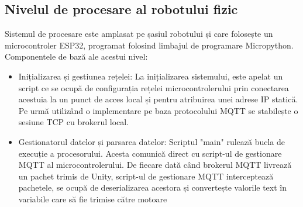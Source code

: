 \subsection{Nivelul de procesare al robotului fizic}
Sistemul de procesare este amplasat pe șasiul robotului și care folosește un microcontroler ESP32, programat folosind limbajul de programare Micropython. Componentele de bază ale acestui nivel:
\begin{itemize}
	\item Inițializarea și gestiunea rețelei: La inițializarea sistemului, este apelat un script ce se ocupă de configurația rețelei microcontrolerului prin conectarea acestuia la un punct de acces local și pentru  atribuirea unei adrese IP statică. Pe urmă utilizând o implementare pe baza protocolului MQTT se stabilește o sesiune TCP cu brokerul local.
	\item Gestionatorul datelor și parsarea datelor: Scriptul "main" rulează bucla de execuție a procesorului. Acesta comunică direct cu script-ul de gestionare MQTT al microcontrolerului. De fiecare dată când brokerul MQTT livrează un pachet trimis de Unity, script-ul de gestionare MQTT interceptează pachetele, se ocupă de deserializarea acestora și convertește valorile text în variabile care să fie trimise către motoare
	
\end{itemize}


